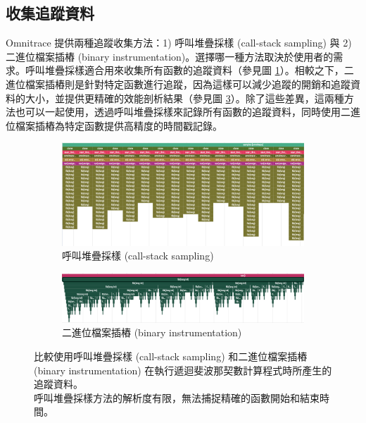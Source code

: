 \subsection{收集追蹤資料}
Omnitrace 提供兩種追蹤收集方法：1) 呼叫堆疊採樣 (call-stack sampling) 與 2) 二進位檔案插樁 (binary instrumentation)。選擇哪一種方法取決於使用者的需求。呼叫堆疊採樣適合用來收集所有函數的追蹤資料（參見圖 \ref{fig:call-stack-sampling}）。相較之下，二進位檔案插樁則是針對特定函數進行追蹤，因為這樣可以減少追蹤的開銷和追蹤資料的大小，並提供更精確的效能剖析結果（參見圖 \ref{fig:binary-instrumentation}）。除了這些差異，這兩種方法也可以一起使用，透過呼叫堆疊採樣來記錄所有函數的追蹤資料，同時使用二進位檔案插樁為特定函數提供高精度的時間戳記錄。

\begin{figure}
    \centering
    \begin{subfigure}[b]{\textwidth}
        \includegraphics[width=\linewidth]{Appendici/CallStackSampling.png}
        \caption{呼叫堆疊採樣 (call-stack sampling)}
        \label{fig:call-stack-sampling}
    \end{subfigure}

    \begin{subfigure}[b]{\textwidth}
        \includegraphics[width=\linewidth]{Appendici/BinaryInstrumentation.png}
        \caption{二進位檔案插樁 (binary instrumentation)}
        \label{fig:binary-instrumentation}
    \end{subfigure}

    \caption{比較使用呼叫堆疊採樣 (call-stack sampling) 和二進位檔案插樁 (binary instrumentation) 在執行遞迴斐波那契數計算程式時所產生的追蹤資料。\\呼叫堆疊採樣方法的解析度有限，無法捕捉精確的函數開始和結束時間。}
    
\end{figure}


